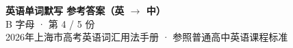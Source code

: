 \documentclass[10pt,a4paper]{article}
\begin{document}
\pagestyle{plain}

\begin{center}
{\LARGE\bfseries 英语单词默写 \quad 参考答案（英 $\to$ 中）}\\[0.22em]
{\large B 字母 · 第 4 / 5 份}\\[0.18em]
{\small 2026年上海市高考英语词汇用法手册 · 参照普通高中英语课程标准}
\end{center}

\vspace{0.2em}
\noindent{\color{rulegray}\rule{\textwidth}{0.8pt}}

\vspace{0.35em}

\vspace{0.25em}
\renewcommand{\arraystretch}{1.32}
\end{document}
